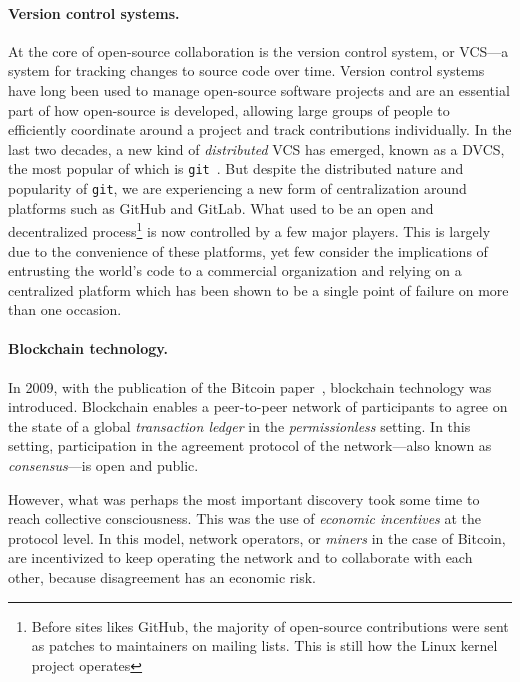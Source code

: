
\paragraph{Version control systems.} At the core of open-source collaboration
is the version control system, or VCS---a system for tracking changes to source
code over time. Version control systems have long been used to manage
open-source software projects and are an essential part of how open-source is
developed, allowing large groups of people to efficiently coordinate around a
project and track contributions individually. In the last two decades, a new
kind of \emph{distributed} VCS has emerged, known as a DVCS, the most popular
of which is \texttt{git}~\cite{git}. But despite the distributed nature
and popularity of \texttt{git}, we are experiencing a new form of
centralization around platforms such as GitHub and GitLab.  What used to be an
open and decentralized process\footnote{Before sites likes GitHub, the majority
of open-source contributions were sent as patches to maintainers on mailing
lists. This is still how the Linux kernel project operates} is now controlled
by a few major players. This is largely due to the convenience of these
platforms, yet few consider the implications of entrusting the world's code to
a commercial organization and relying on a centralized platform which has been
shown to be a single point of failure on more than one occasion.

\paragraph{Blockchain technology.} In 2009, with the publication of the Bitcoin
paper~\cite{bitcoin}, blockchain technology was introduced. Blockchain enables
a peer-to-peer network of participants to agree on the state of a global
\emph{transaction ledger} in the \emph{permissionless} setting. In this
setting, participation in the agreement protocol of the network---also known as
\emph{consensus}---is open and public.

However, what was perhaps the most important discovery took some time to reach
collective consciousness. This was the use of \emph{economic incentives} at the
protocol level. In this model, network operators, or \emph{miners} in the
case of Bitcoin, are incentivized to keep operating the network and to
collaborate with each other, because disagreement has an economic risk.


